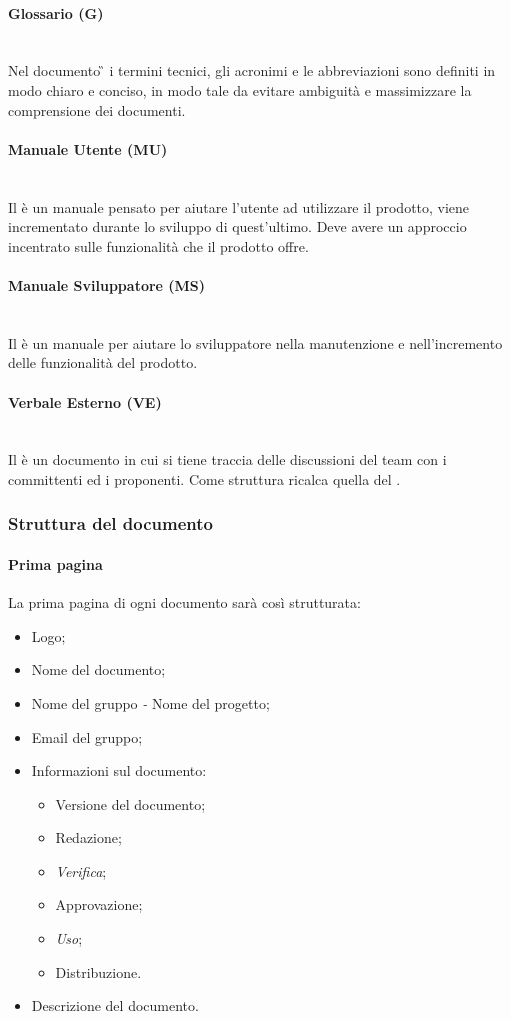 	\paragraph{Glossario (G)}
	~\\Nel documento \G{} i termini tecnici, gli acronimi e le abbreviazioni sono definiti in modo chiaro e conciso, in modo tale da evitare ambiguità e massimizzare la comprensione dei documenti.
	\paragraph{Manuale Utente (MU)}
	~\\Il \MU{} è un manuale pensato per aiutare l'utente ad utilizzare il prodotto, viene incrementato durante lo sviluppo di quest'ultimo. Deve avere un approccio incentrato sulle funzionalità che il prodotto offre.
	\paragraph{Manuale Sviluppatore (MS)}
	~\\Il \MS{} è un manuale per aiutare lo sviluppatore nella manutenzione e nell'incremento delle funzionalità del prodotto.
	\paragraph{Verbale Esterno (VE)}
	~\\Il \VE{} è un documento in cui si tiene traccia delle discussioni del team con i committenti ed i proponenti. Come struttura ricalca quella del \VI.
	
	\subsubsection{Struttura del documento}
	\paragraph{Prima pagina}
	La prima pagina di ogni documento sarà così strutturata:
	\begin{itemize}
		\item Logo;
		\item Nome del documento;
		\item Nome del gruppo \emph{-} Nome del progetto;
		\item Email del gruppo;
		\item Informazioni sul documento:
		\begin{itemize}
			\item Versione del documento;
			\item Redazione;
			\item \emph{Verifica};
			\item Approvazione;
			\item \emph{Uso};
			\item Distribuzione.
		\end{itemize}
		\item Descrizione del documento.
	\end{itemize}
